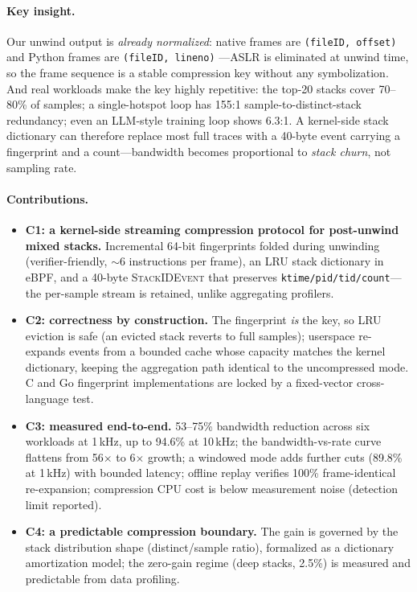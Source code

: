 \documentclass[letterpaper,twocolumn,10pt]{article}
\begin{document}
\paragraph{Key insight.}
Our unwind output is \emph{already normalized}: native frames are
\texttt{(fileID, offset)} and Python frames are \texttt{(fileID, lineno)}
---ASLR is eliminated at unwind time, so the frame sequence is a stable
compression key without any symbolization. And real workloads make the key
highly repetitive: the top-20 stacks cover 70--80\% of samples; a
single-hotspot loop has 155:1 sample-to-distinct-stack redundancy; even an
LLM-style training loop shows 6.3:1. A kernel-side stack dictionary can
therefore replace most full traces with a 40-byte event carrying a
fingerprint and a count---bandwidth becomes proportional to \emph{stack
churn}, not sampling rate.

\paragraph{Contributions.}
\begin{itemize}
\item \textbf{C1: a kernel-side streaming compression protocol for
post-unwind mixed stacks.} Incremental 64-bit fingerprints folded during
unwinding (verifier-friendly, $\sim$6 instructions per frame), an LRU stack
dictionary in eBPF, and a 40-byte \textsc{StackIDEvent} that preserves
\texttt{ktime/pid/tid/count}---the per-sample stream is retained, unlike
aggregating profilers.
\item \textbf{C2: correctness by construction.} The fingerprint \emph{is}
the key, so LRU eviction is safe (an evicted stack reverts to full samples);
userspace re-expands events from a bounded cache whose capacity matches the
kernel dictionary, keeping the aggregation path identical to the
uncompressed mode. C and Go fingerprint implementations are locked by a
fixed-vector cross-language test.
\item \textbf{C3: measured end-to-end.} 53--75\% bandwidth reduction across
six workloads at 1\,kHz, up to 94.6\% at 10\,kHz; the bandwidth-vs-rate
curve flattens from 56$\times$ to 6$\times$ growth; a windowed mode adds
further cuts (89.8\% at 1\,kHz) with bounded latency; offline replay
verifies 100\% frame-identical re-expansion; compression CPU cost is below
measurement noise (detection limit reported).
\item \textbf{C4: a predictable compression boundary.} The gain is governed
by the stack distribution shape (distinct/sample ratio), formalized as a
dictionary amortization model; the zero-gain regime (deep stacks, 2.5\%) is
measured and predictable from data profiling.
\end{itemize}
\end{document}
